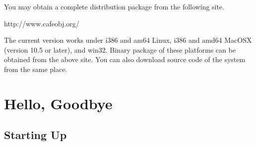 \documentclass[a4paper]{memoir}
\begin{document}
You may obtain a complete distribution package from the
following site. 
\begin{vvtm}
\begin{ccode}
  http://www.cafeobj.org/
\end{ccode}
\end{vvtm}

The current version works under i386 and am64 Linux, i386 and amd64
MacOSX (version 10.5 or later), and win32. Binary package of these
platforms can be obtained from the above site. You can also download
source code of the system from the same place. 


\section{Hello, Goodbye}\label{sec:p2-startup}

\subsection{Starting Up}
\end{document}

